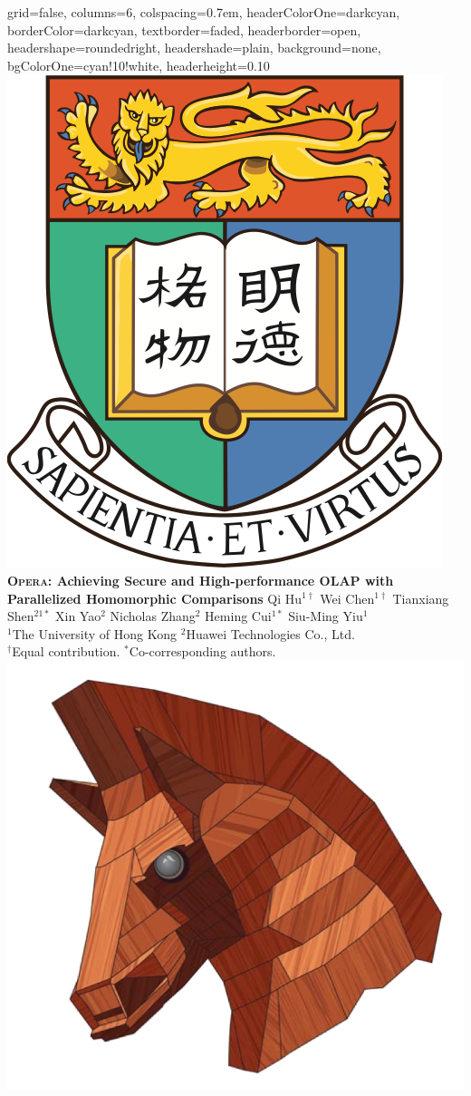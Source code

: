 \documentclass[portrait,a1paper,fontscale=0.42]{baposter}
\newcommand{\Sys}{\textsc{Opera}\xspace}
\begin{document}
\begin{poster}{
    grid=false,
    columns=6,
    colspacing=0.7em,
    headerColorOne=darkcyan,
    borderColor=darkcyan,
    textborder=faded,
    headerborder=open,
    headershape=roundedright,
    headershade=plain,
    background=none,
    bgColorOne=cyan!10!white,
    headerheight=0.10\textheight
}
{
    \makebox[0.01\textwidth]{}
    \includegraphics[width=0.05\linewidth]{logo/HKU_logo}
    \makebox[0.03\textwidth]{}
}
{
    \huge\bf \Sys{}: Achieving Secure and High-performance OLAP with Parallelized Homomorphic Comparisons
}
{\normalsize
    \vspace{0.3em}
        Qi Hu$^{1\dagger}$ \enspace
        Wei Chen$^{1\dagger}$ \enspace
        Tianxiang Shen$^{21*}$ \enspace
        Xin Yao$^{2}$ \enspace
        Nicholas Zhang$^{2}$ \enspace
        Heming Cui$^{1*}$ \enspace
        Siu-Ming Yiu$^{1}$ \\
    {\normalsize $^{1}$The University of Hong Kong \enspace$^{2}$Huawei Technologies Co., Ltd.} \\
    {\normalsize $^\dagger$Equal contribution. $^*$Co-corresponding authors.}
}
{
    \includegraphics[width=0.08\linewidth]{logo/trojan.png}
    \makebox[0.01\textwidth]{}
}



\end{poster}
\end{document}
